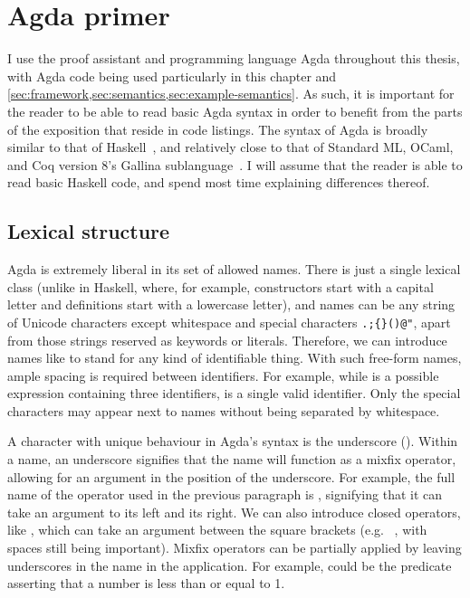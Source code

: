 \section{Agda primer}\label{sec:agda-primer}

I use the proof assistant and programming language Agda throughout this thesis,
with Agda code being used particularly in this chapter and
\cref{sec:framework,sec:semantics,sec:example-semantics}.
As such, it is important for the reader to be able to read basic Agda syntax in
order to benefit from the parts of the exposition that reside in code listings.
The syntax of Agda is broadly similar to that of Haskell~\citep{Haskell}, and
relatively close to that of Standard ML, OCaml, and Coq version 8's Gallina
sublanguage~\citep{SML,OCaml,Coq}.
I will assume that the reader is able to read basic Haskell code, and spend most
time explaining differences thereof.

\subsection{Lexical structure}

Agda is extremely liberal in its set of allowed names.
There is just a single lexical class (unlike in Haskell, where, for example,
constructors start with a capital letter and definitions start with a lowercase
letter), and names can be any string of Unicode characters except whitespace and
special characters \verb|.;{}()@"|, apart from those strings reserved as
keywords or literals.
Therefore, we can introduce names like
to stand for any kind of identifiable thing.
With such free-form names, ample spacing is required between identifiers.
For example, while \AgdaSpace{}\AgdaDatatype{$\leq$}\AgdaSpace{}%
 is a possible expression containing three
identifiers,  is a single
valid identifier.
Only the special characters may appear next to names without being separated by
whitespace.

A character with unique behaviour in Agda's syntax is the underscore
(\AgdaSymbol{\_}).
Within a name, an underscore signifies that the name will function as a mixfix
operator, allowing for an argument in the position of the underscore.
For example, the full name of the \AgdaDatatype{$\leq$} operator used in the
previous paragraph is \AgdaDatatype{\_$\leq$\_}, signifying that it can take an
argument to its left and its right.
We can also introduce closed operators, like \AgdaDatatype{[\_]}, which can take
an argument between the square brackets (e.g.\ \AgdaDatatype{[}\AgdaSpace{}%
\AgdaSpace{}\AgdaDatatype{]}, with spaces still being important).
Mixfix operators can be partially applied by leaving underscores in the name in
the application.
For example, \AgdaDatatype{\_$\leq$}\AgdaSpace{} could be the
predicate asserting that a number is less than or equal to 1.

